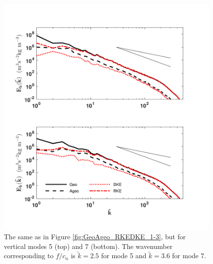 \begin{figure}[H]
\includegraphics[scale=1]{Chapter4/img/GeoAgeo_RKEDKE_5-7}
\caption{The same as in Figure \ref{fig:GeoAgeo_RKEDKE_1-3}, but for vertical modes 5 (top) and 7 (bottom).  The wavenumber corresponding to $f/c_n$ is  $\tilde{k} = 2.5$ for mode 5 and $\tilde{k} = 3.6$ for mode 7.}
\label{fig:GeoAgeo_RKEDKE_5-7}
\end{figure}

